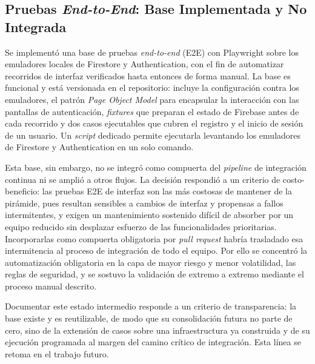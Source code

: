 \subsection{Pruebas \textit{End-to-End}: Base Implementada y No Integrada}\label{subsec:evaluacion-e2e}

Se implementó una base de pruebas \textit{end-to-end} (E2E) con Playwright sobre los emuladores locales de Firestore y Authentication, con el fin de automatizar recorridos de interfaz verificados hasta entonces de forma manual. La base es funcional y está versionada en el repositorio: incluye la configuración contra los emuladores, el patrón \textit{Page Object Model} para encapsular la interacción con las pantallas de autenticación, \textit{fixtures} que preparan el estado de Firebase antes de cada recorrido y dos casos ejecutables que cubren el registro y el inicio de sesión de un usuario. Un \textit{script} dedicado permite ejecutarla levantando los emuladores de Firestore y Authentication en un solo comando.

Esta base, sin embargo, no se integró como compuerta del \textit{pipeline} de integración continua ni se amplió a otros flujos. La decisión respondió a un criterio de costo-beneficio: las pruebas E2E de interfaz son las más costosas de mantener de la pirámide, pues resultan sensibles a cambios de interfaz y propensas a fallos intermitentes, y exigen un mantenimiento sostenido difícil de absorber por un equipo reducido sin desplazar esfuerzo de las funcionalidades prioritarias. Incorporarlas como compuerta obligatoria por \textit{pull request} habría trasladado esa intermitencia al proceso de integración de todo el equipo. Por ello se concentró la automatización obligatoria en la capa de mayor riesgo y menor volatilidad, las reglas de seguridad, y se sostuvo la validación de extremo a extremo mediante el proceso manual descrito.

Documentar este estado intermedio responde a un criterio de transparencia: la base existe y es reutilizable, de modo que su consolidación futura no parte de cero, sino de la extensión de casos sobre una infraestructura ya construida y de su ejecución programada al margen del camino crítico de integración. Esta línea se retoma en el trabajo futuro.
